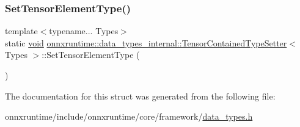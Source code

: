 \subsubsection{\texorpdfstring{Set\+Tensor\+Element\+Type()}{SetTensorElementType()}}
{\footnotesize\ttfamily template$<$typename... Types$>$ \\
static \mbox{\hyperlink{mlasi_8h_a88f941d423cb2a819b70a1358982b1a6}{void}} \mbox{\hyperlink{structonnxruntime_1_1data__types__internal_1_1TensorContainedTypeSetter}{onnxruntime\+::data\+\_\+types\+\_\+internal\+::\+Tensor\+Contained\+Type\+Setter}}$<$ Types $>$\+::Set\+Tensor\+Element\+Type (\begin{DoxyParamCaption}\item[{O\+N\+N\+X\+\_\+\+N\+A\+M\+E\+S\+P\+A\+C\+E\+::\+Type\+Proto \&}]{ }\end{DoxyParamCaption})\hspace{0.3cm}{\ttfamily [static]}}



The documentation for this struct was generated from the following file\+:\begin{DoxyCompactItemize}
\item 
onnxruntime/include/onnxruntime/core/framework/\mbox{\hyperlink{data__types_8h}{data\+\_\+types.\+h}}\end{DoxyCompactItemize}
